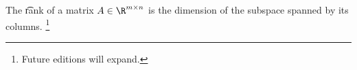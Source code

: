

The \t{rank} of a matrix $A \in \R ^{m \times  n}$ is the dimension of the subspace spanned by its columns.
  \ifhmode\unskip\fi\footnote{
Future editions will expand.
  }

\blankpage
